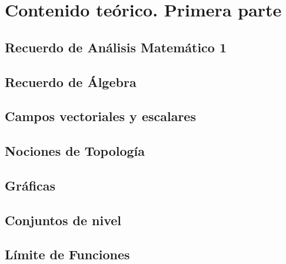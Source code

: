 \documentclass[10pt, a4paper]{report}
\begin{document}
  \chapter{Contenido teórico. Primera parte}
    
 
\section{Recuerdo de Análisis Matemático 1}

          
      
        
\section{Recuerdo de Álgebra}

           
        
         
\section{Campos vectoriales y escalares}
 
   
 
  
                       
\section{Nociones de Topolog\'ia}
 
  
     
 
       
      
\section{Gráficas}

         

            
 \section{Conjuntos de nivel}
   
       
  
  
         
    \section{L\'imite de Funciones}
    
       
\end{document}
